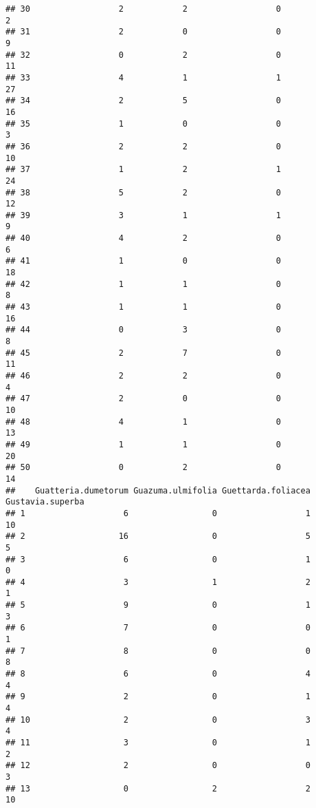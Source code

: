 \documentclass[
]{article}
\begin{document}
\begin{verbatim}
## 30                  2            2                  0               2
## 31                  2            0                  0               9
## 32                  0            2                  0              11
## 33                  4            1                  1              27
## 34                  2            5                  0              16
## 35                  1            0                  0               3
## 36                  2            2                  0              10
## 37                  1            2                  1              24
## 38                  5            2                  0              12
## 39                  3            1                  1               9
## 40                  4            2                  0               6
## 41                  1            0                  0              18
## 42                  1            1                  0               8
## 43                  1            1                  0              16
## 44                  0            3                  0               8
## 45                  2            7                  0              11
## 46                  2            2                  0               4
## 47                  2            0                  0              10
## 48                  4            1                  0              13
## 49                  1            1                  0              20
## 50                  0            2                  0              14
##    Guatteria.dumetorum Guazuma.ulmifolia Guettarda.foliacea Gustavia.superba
## 1                    6                 0                  1               10
## 2                   16                 0                  5                5
## 3                    6                 0                  1                0
## 4                    3                 1                  2                1
## 5                    9                 0                  1                3
## 6                    7                 0                  0                1
## 7                    8                 0                  0                8
## 8                    6                 0                  4                4
## 9                    2                 0                  1                4
## 10                   2                 0                  3                4
## 11                   3                 0                  1                2
## 12                   2                 0                  0                3
## 13                   0                 2                  2               10

\end{verbatim}
\end{document}
